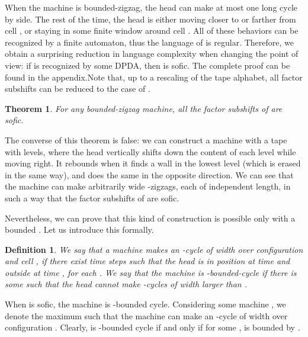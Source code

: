 \documentclass{llncs}
\newtheorem{teo}{Theorem}
\newtheorem{defi}{Definition}
\begin{document}
When the machine is bounded-zigzag, the head can make at most one long cycle by side.
The rest of the time, the head is either moving closer to or farther from cell , or staying in some finite window around cell .
All of these behaviors can be recognized by a finite automaton, thus the language of  is regular.
Therefore, we obtain a surprising reduction in language complexity when changing the point of view: if  is recognized by some DPDA, then  is sofic. The complete proof can be found in the appendix.Note that, up to a rescaling of the tape alphabet, all factor subshifts can be reduced to the case of .
\begin{teo}\label{t:zigsof}
 For any bounded-zigzag machine, all the factor subshifts of  are sofic.
\end{teo}
The converse of this theorem is false: we can construct a machine with a tape with  levels, where the head vertically shifts down the content of each level while moving right.
It rebounds when it finds a wall in the lowest level (which is erased in the same way), and does the same in the opposite direction.
We can see that the machine can make arbitrarily wide -zigzags, each of independent length, in such a way that the factor subshifts of  are sofic.

Nevertheless, we can prove that this kind of construction is possible only with a bounded .
Let us introduce this formally.
\begin{defi}
 We say that a machine makes an \emph{-cycle} of width  over configuration  and cell , if there exist  time steps  such that the head is in position  at time  and outside  at time , for each .
We say that the machine is -bounded-cycle if there is some  such that the head cannot make -cycles of width larger than .
\end{defi}
When  is sofic, the machine is -bounded cycle.
Considering some machine , we denote  the maximum  such that the machine can make an -cycle of width  over configuration .
Clearly,  is -bounded cycle if and only if for some ,  is bounded by .
\end{document}
